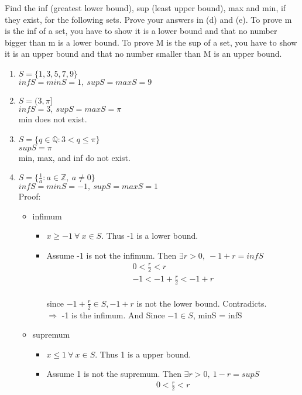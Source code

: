 \documentclass[]{exam}
\begin{document}
\begin{questions}
\question  Find the inf (greatest lower bound), sup (least upper bound), max and min, if they exist, for the following sets. Prove your answers in (d) and (e). To prove m is the inf of a set, you have to show it is a lower bound and that no number bigger than m is a lower bound. To prove M is the sup of a set, you have to show it is an upper bound and that no number smaller than M is an upper bound.
\begin{enumerate}[label = (\alph*)]
	\item $S = \{1, 3, 5, 7, 9\}$
	\\ $infS = minS = 1, \ supS = maxS = 9$
	\item $S = (3, \pi]$
	\\ $infS = 3, \ supS = maxS = \pi$
	\\ min does not exist.
	\item $S =  \{q \in \mathbb{Q} : 3 < q \leq \pi\}$
	\\ $supS = \pi$
	\\ min, max, and inf do not exist.
	\item $S = \{\frac{1}{a}: a\in\mathbb{Z},\ a \neq 0\}$
	\\ $infS = minS = -1, \ supS = maxS = 1$
	\\ Proof: 
	\begin{itemize}
		\item infimum 
		\begin{itemize}
			\item $x \geq -1\ \forall\ x \in S$. Thus -1 is a lower bound.
			\item Assume -1 is not the infimum. Then $\exists r > 0,\ -1 + r = infS$
			\begin{gather*}
				0  < \frac{r}{2} < r \\
				-1  < -1 + \frac{r}{2} < -1 + r
			\end{gather*}
			\\ since $-1 + \frac{r}{2} \in S, -1 + r$ is not the lower bound. Contradicts.
			\\ $\Rightarrow$ -1 is the infimum. And Since $-1 \in S$, minS = infS
		\end{itemize}
		\item supremum
		\begin{itemize}
			\item $x \leq 1\ \forall\ x \in S$. Thus 1 is a upper bound.
			\item Assume 1 is not the supremum. Then $\exists r > 0,\ 1 - r = supS$
			\begin{gather*}
				0 < \frac{r}{2} < r \\

\end{gather*}
\end{itemize}
\end{itemize}
\end{enumerate}
\end{questions}
\end{document}
